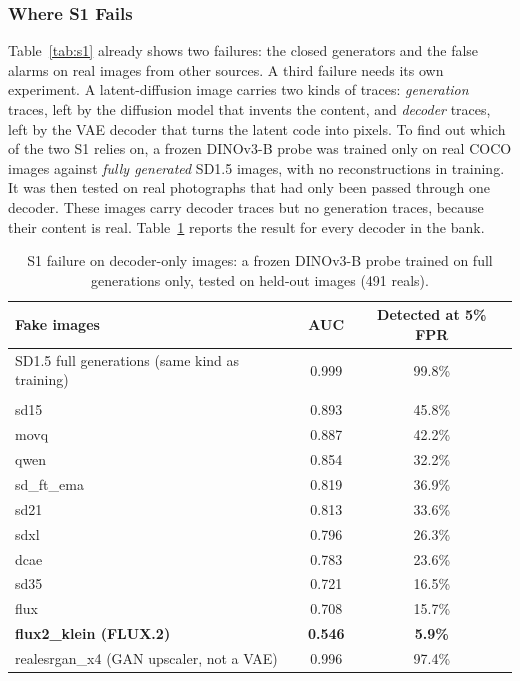 \subsubsection{Where S1 Fails}

Table~\ref{tab:s1} already shows two failures: the closed generators and the false alarms on real images from other sources. A third failure needs its own experiment. A latent-diffusion image carries two kinds of traces: \textit{generation} traces, left by the diffusion model that invents the content, and \textit{decoder} traces, left by the VAE decoder that turns the latent code into pixels. To find out which of the two S1 relies on, a frozen DINOv3-B probe was trained only on real COCO images against \textit{fully generated} SD1.5 images, with no reconstructions in training. It was then tested on real photographs that had only been passed through one decoder. These images carry decoder traces but no generation traces, because their content is real. Table~\ref{tab:s1fail} reports the result for every decoder in the bank.

\begin{table}[H]
\centering
\small
\caption{S1 failure on decoder-only images: a frozen DINOv3-B probe trained on full generations only, tested on held-out images (491 reals).}
\label{tab:s1fail}
\begin{tabular}{>{\raggedright\arraybackslash}p{6.2cm} c c}
\toprule
\textbf{Fake images} & \textbf{AUC} & \textbf{Detected at 5\% FPR} \\
\midrule
SD1.5 full generations (same kind as training) & 0.999 & 99.8\% \\
\midrule
\multicolumn{3}{l}{\textit{Real photographs reconstructed by one decoder (VAE-only)}} \\
sd15 & 0.893 & 45.8\% \\
movq & 0.887 & 42.2\% \\
qwen & 0.854 & 32.2\% \\
sd\_ft\_ema & 0.819 & 36.9\% \\
sd21 & 0.813 & 33.6\% \\
sdxl & 0.796 & 26.3\% \\
dcae & 0.783 & 23.6\% \\
sd35 & 0.721 & 16.5\% \\
flux & 0.708 & 15.7\% \\
\textbf{flux2\_klein (FLUX.2)} & \textbf{0.546} & \textbf{5.9\%} \\
\midrule
realesrgan\_x4 (GAN upscaler, not a VAE) & 0.996 & 97.4\% \\
\bottomrule
\end{tabular}
\end{table}

